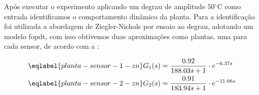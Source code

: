 Após executar o experimento aplicando um degrau de amplitude
$50^\circ\mathrm{C}$ como entrada identificamos o comportamento dinâmico da
planta. Para a identificação foi utilizada a abordagem de Ziegler-Nichols por
ensaio ao degrau, adotando um modelo \gls{fopdt}, com isso obtivemos duas
aproximações como plantas, uma para cada sensor, de acordo com a
:

\begin{align}
\eqlabel{planta-sensor-1-zn}
G_{1}(s) &= \frac{0.92}{188.03s + 1} \cdot e^{-6.37s}\\
\eqlabel{planta-sensor-2-zn}
G_{2}(s) &= \frac{0.91}{183.94s + 1} \cdot e^{-11.66s}
\end{align}